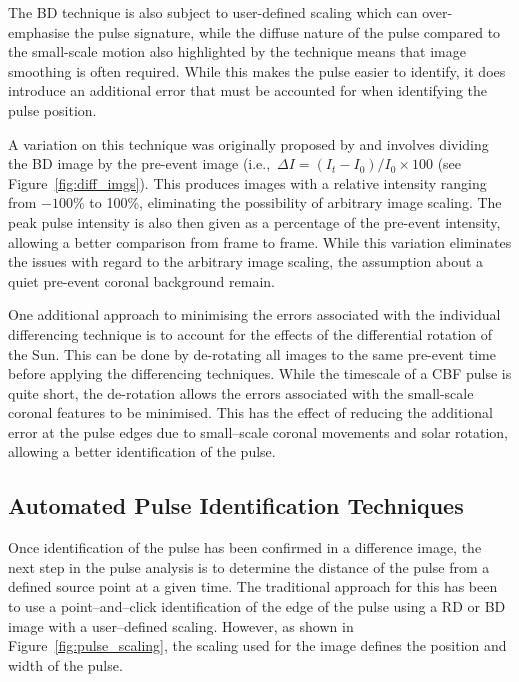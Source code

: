 The BD technique is also subject to user-defined scaling which can over-emphasise the pulse signature, while the diffuse nature of the pulse compared to the small-scale motion also highlighted by the technique means that image smoothing is often required. While this makes the pulse easier to identify, it does introduce an additional error that must be accounted for when identifying the pulse position.

A variation on this technique was originally proposed by \citet{Wills-Davey:1999ve} and involves dividing the BD image by the pre-event image (i.e.,\ $\Delta I = (I_{t} - I_{0})/I_{0} \times 100$ (see Figure~\ref{fig:diff_imgs}). This produces images with a relative intensity ranging from $-100$\% to 100\%, eliminating the possibility of arbitrary image scaling. The peak pulse intensity is also then given as a percentage of the pre-event intensity, allowing a better comparison from frame to frame. While this variation eliminates the issues with regard to the arbitrary image scaling, the assumption about a quiet pre-event coronal background remain.

One additional approach to minimising the errors associated with the individual differencing technique is to account for the effects of the differential rotation of the Sun. This can be done by de-rotating all images to the same pre-event time before applying the differencing techniques. While the timescale of a CBF pulse is quite short, the de-rotation allows the errors associated with the small-scale coronal features to be minimised. This has the effect of reducing the additional error at the pulse edges due to small--scale coronal movements and solar rotation, allowing a better identification of the pulse.

\subsection{Automated Pulse Identification Techniques}
\label{subsect:cor_pita}

Once identification of the pulse has been confirmed in a difference image, the next step in the pulse analysis is to determine the distance of the pulse from a defined source point at a given time. The traditional approach for this has been to use a point--and--click identification of the edge of the pulse using a RD or BD image with a user--defined scaling. However, as shown in Figure~\ref{fig:pulse_scaling}, the scaling used for the image defines the position and width of the pulse.

